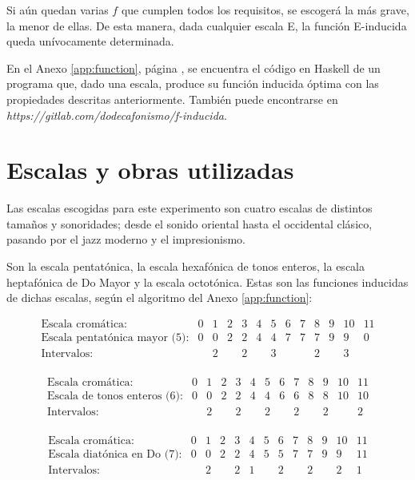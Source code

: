 		Si aún quedan varias $f$ que cumplen todos los requisitos, se escogerá la más grave, la menor de ellas. De esta manera, dada cualquier escala E, la función E-inducida queda unívocamente determinada.
		
		En el Anexo \ref{app:function}, página \pageref{app:function}, se encuentra el código en Haskell de un programa que, dado una escala, produce su función inducida óptima con las propiedades descritas anteriormente. También puede encontrarse en \textit{https://gitlab.com/dodecafonismo/f-inducida}.
		
	\section{Escalas y obras utilizadas}
	
		Las escalas escogidas para este experimento son cuatro escalas de distintos tamaños y sonoridades; desde el sonido oriental hasta el occidental clásico, pasando por el jazz moderno y el impresionismo.
		
		Son la escala pentatónica, la escala hexafónica de tonos enteros, la escala heptafónica de Do Mayor y la escala octotónica. Estas son las funciones inducidas de dichas escalas, según el algoritmo del Anexo \ref{app:function}:
	
		\[\left.\begin{matrix}
		\text{Escala cromática:}&0&1&2&3&4&5&6&7&8&9&10&11\\
		\text{Escala pentatónica mayor (5):}&0&0&2&2&4&4&7&7&7&9&9&0\\
		\text{Intervalos:}&&2&&2&&3&&&2&&3&\\
		\end{matrix}\right.\]
		
		\[\left.\begin{matrix}
		\text{Escala cromática:}&0&1&2&3&4&5&6&7&8&9&10&11\\
		\text{Escala de tonos enteros (6):}&0&0&2&2&4&4&6&6&8&8&10&10\\
		\text{Intervalos:}&&2&&2&&2&&2&&2&&2\\
		\end{matrix}\right.\]

        \[\left.\begin{matrix}
        \text{Escala cromática:}&0&1&2&3&4&5&6&7&8&9&10&11\\
        \text{Escala diatónica en Do (7):}&0&0&2&2&4&5&5&7&7&9&9&11\\
        \text{Intervalos:}&&2&&2&1&&2&&2&&2&1\\
        \end{matrix}\right.\]
        
